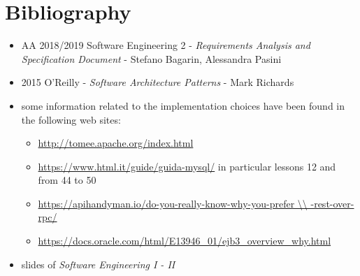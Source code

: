 \section{Bibliography}
\begin{itemize}
	\item AA 2018/2019 Software Engineering 2 - \emph{Requirements Analysis and Specification Document} - Stefano Bagarin, 			Alessandra Pasini
	\item 2015 O'Reilly -  \emph{Software Architecture Patterns} - Mark Richards
	\item some information related to the implementation choices have been found in the following web sites: 
		\begin{itemize}
			\item \url{http://tomee.apache.org/index.html}
			\item \url{https://www.html.it/guide/guida-mysql/} in particular lessons 12 and from 44 to 50
			\item \url{https://apihandyman.io/do-you-really-know-why-you-prefer \\
			-rest-over-rpc/}
			\item \url{https://docs.oracle.com/html/E13946_01/ejb3_overview_why.html}
		\end{itemize}
	\item slides of \emph{Software Engineering I - II}
\end{itemize}
